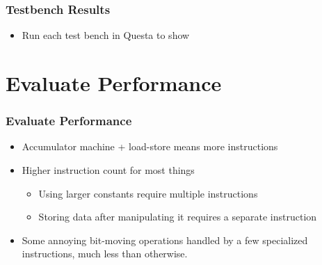 	\begin{frame}
		\frametitle{Testbench Results}

		\begin{itemize}
			\item Run each test bench in Questa to show
		\end{itemize}
	\end{frame}

	\section{Evaluate Performance}

	\begin{frame}
		\frametitle{Evaluate Performance}

		\begin{itemize}
			\item Accumulator machine + load-store means more instructions
			\item Higher instruction count for most things
				\begin{itemize}
					\item Using larger constants require multiple instructions
					\item Storing data after manipulating it requires a separate instruction
				\end{itemize}
			\item Some annoying bit-moving operations handled by a few specialized instructions, much less than otherwise.
		\end{itemize}
	\end{frame}


